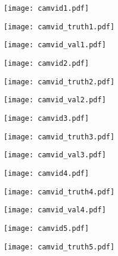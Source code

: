 \documentclass[journal]{IEEEtran}
\begin{document}
\begin{figure}
\centering
\begin{minipage}{1.1in}
\texttt{[image: camvid1.pdf]}
\end{minipage}
\begin{minipage}{1.1in}
\texttt{[image: camvid\_truth1.pdf]}
\end{minipage}
\vspace{0.3em}
\begin{minipage}{1.1in}
\texttt{[image: camvid\_val1.pdf]}
\end{minipage}
\vspace{0.3em}
\begin{minipage}{1.1in}
\texttt{[image: camvid2.pdf]}
\end{minipage}
\begin{minipage}{1.1in}
\texttt{[image: camvid\_truth2.pdf]}
\end{minipage}
\begin{minipage}{1.1in}
\texttt{[image: camvid\_val2.pdf]}
\end{minipage}
\vspace{0.3em}
\begin{minipage}{1.1in}
\texttt{[image: camvid3.pdf]}
\end{minipage}
\begin{minipage}{1.1in}
\texttt{[image: camvid\_truth3.pdf]}
\end{minipage}
\begin{minipage}{1.1in}
\texttt{[image: camvid\_val3.pdf]}
\end{minipage}
\vspace{0.3em}
\begin{minipage}{1.1in}
\texttt{[image: camvid4.pdf]}
\end{minipage}
\begin{minipage}{1.1in}
\texttt{[image: camvid\_truth4.pdf]}
\end{minipage}
\begin{minipage}{1.1in}
\texttt{[image: camvid\_val4.pdf]}
\end{minipage}
\vspace{0.3em}
\begin{minipage}{1.1in}
\texttt{[image: camvid5.pdf]}
\end{minipage}
\begin{minipage}{1.1in}
\texttt{[image: camvid\_truth5.pdf]}

\end{minipage}
\end{figure}
\end{document}
